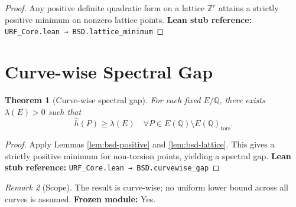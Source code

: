 \documentclass[11pt]{article}
\theoremstyle{plain}
\newtheorem{theorem}{Theorem}
\theoremstyle{remark}
\newtheorem{remark}[theorem]{Remark}
\newcommand{\Q}{\mathbb{Q}}
\newcommand{\Z}{\mathbb{Z}}
\newcommand{\hath}{\hat h}
\begin{document}
\begin{proof}
Any positive definite quadratic form on a lattice $\Z^r$ attains a strictly positive minimum on nonzero lattice points.  
\textbf{Lean stub reference:} \texttt{URF\_Core.lean → BSD.lattice\_minimum}
\end{proof}

\section{Curve-wise Spectral Gap}

\begin{theorem}[Curve-wise spectral gap]\label{thm:bsd-curvewise}
For each fixed $E/\Q$, there exists $\lambda(E)>0$ such that
\[
\hath(P) \ge \lambda(E) \quad \forall P \in E(\Q)\setminus E(\Q)_{\mathrm{tors}}.
\]
\end{theorem}

\begin{proof}
Apply Lemmas \ref{lem:bsd-positive} and \ref{lem:bsd-lattice}.  
This gives a strictly positive minimum for non-torsion points, yielding a spectral gap.  
\textbf{Lean stub reference:} \texttt{URF\_Core.lean → BSD.curvewise\_gap}
\end{proof}

\begin{remark}[Scope]
The result is curve-wise; no uniform lower bound across all curves is assumed.  
\textbf{Frozen module:} Yes.
\end{remark}
\end{document}
